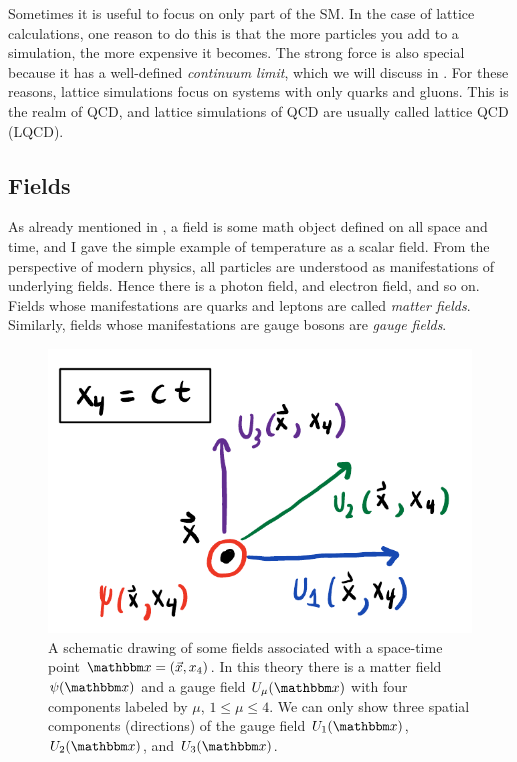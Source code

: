 Sometimes it is useful to focus on only part of the SM. In the case of lattice
calculations, one reason to do this is that the more particles you add to a
simulation, the more expensive it becomes. The strong force is also special
because it has a well-defined {\it continuum limit}, which we will discuss in
. For these reasons, lattice simulations focus on systems with
only quarks and gluons. This is the realm of QCD, and lattice simulations of QCD
are usually called lattice QCD (LQCD). 

\subsection{Fields}\label{sec:fields}

As already mentioned in , a field is some math object defined on
all space and time, and I gave the simple example of temperature as a scalar
field. From the perspective of modern physics, all particles are understood as
manifestations of underlying fields. Hence there is a photon field, and electron
field, and so on. Fields whose manifestations are quarks and leptons are called
{\it matter fields}. Similarly, fields whose manifestations
are gauge bosons are {\it gauge fields}.

\begin{figure}
  \centering
  \includegraphics[width=0.6\linewidth]{figs/fields.pdf}
  \caption{A schematic drawing of some fields associated with a space-time point
           $\fvec{x}=(\vec{x},x_4)$. In this theory there is a matter field
           $\psi(\fvec{x})$ and a gauge field $U_\mu(\fvec{x})$ with four
           components labeled by $\mu$, $1\leq\mu\leq4$.
           We can only show three spatial components (directions) of the gauge field 
           $U_1(\fvec{x})$, $U_2(\fvec{x})$, and $U_3(\fvec{x})$.}
  \label{fig:fields}
\end{figure}

